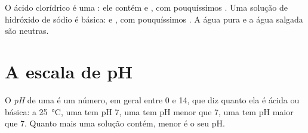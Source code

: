 \begin{example}\label{ex:g9:acids-bases-ph:three}
O ácido clorídrico é uma : ele contém   e
, com pouquíssimos . Uma solução de hidróxido de
sódio é básica:  e , com pouquíssimos .
A água pura e a água salgada são neutras.
\end{example}

\section{A escala de pH}

\begin{definition}[pH]\label{def:g9:acids-bases-ph:ph}
O \emph{pH} de uma  é um número, em geral entre 0
e 14, que diz quanto ela é ácida ou básica: a \qty{25}{\celsius}, uma
 tem pH 7, uma  tem pH menor que 7, uma
 tem pH maior que 7. Quanto mais   uma solução
contém, menor é o seu pH.
\end{definition}

